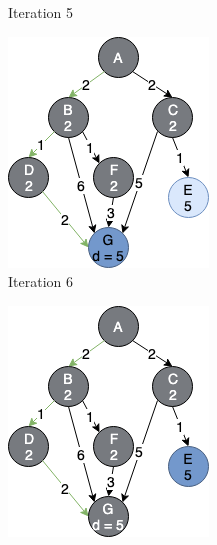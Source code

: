 \begin{figure}[h!]
\begin{subfigure}[b]{0.2\linewidth}
     \caption{Iteration 5}
  \end{subfigure}
  \hfill
  \begin{subfigure}[b]{0.2\linewidth}
    \includegraphics[width=\linewidth]{images/a_star_expansion6.png}
    \caption{Iteration 6}
  \end{subfigure}
  \hfill
  \begin{subfigure}[b]{0.2\linewidth}
    \includegraphics[width=\linewidth]{images/a_star_expansion7.png}

\end{subfigure}
\end{figure}
